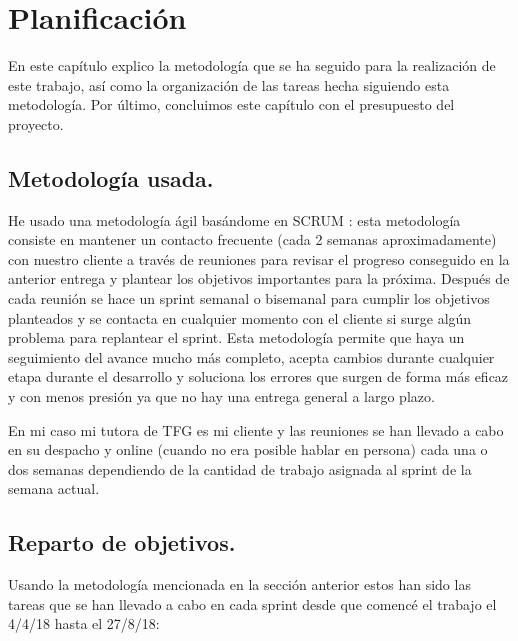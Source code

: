 \chapter{Planificación}

En este capítulo explico la metodología que se ha seguido para la realización de este trabajo, así como la organización de las tareas hecha siguiendo esta metodología.
\newline
Por último, concluimos este capítulo con el presupuesto del proyecto.


\section{Metodología usada.}

He usado una metodología ágil \cite{metodologia_agil} basándome en SCRUM \cite{scrum}: esta metodología consiste en mantener un contacto frecuente (cada 2 semanas aproximadamente) con nuestro cliente a través de reuniones para revisar el progreso conseguido en la anterior entrega y plantear los objetivos importantes para la próxima. Después de cada reunión se hace un sprint semanal o bisemanal para cumplir los objetivos planteados y se contacta en cualquier momento con el cliente si surge algún problema para replantear el sprint.
\newline
Esta metodología permite que haya un seguimiento del avance mucho más completo, acepta cambios durante cualquier etapa durante el desarrollo y soluciona los errores que surgen de forma más eficaz y con menos presión ya que no hay una entrega general a largo plazo.

En mi caso mi tutora de TFG es mi cliente y las reuniones se han llevado a cabo en su despacho y online (cuando no era posible hablar en persona) cada una o dos semanas dependiendo de la cantidad de trabajo asignada al sprint de la semana actual.


\section{Reparto de objetivos.}

Usando la metodología mencionada en la sección anterior estos han sido las tareas que se han llevado a cabo en cada sprint desde que comencé el trabajo el 4/4/18 hasta el 27/8/18:

